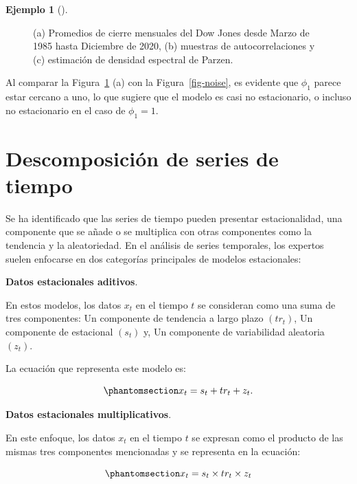 \documentclass[
  us-letterpaper,
]{scrreprt}
\theoremstyle{plain}
\theoremstyle{definition}
\theoremstyle{definition}
\newtheorem{example}{Ejemplo}[chapter]
\theoremstyle{remark}
\begin{document}
\begin{example}[]
\begin{tcolorbox}
\begin{figure}[H]
{}

\caption{\label{fig-DOW}(a) Promedios de cierre mensuales del Dow Jones
desde Marzo de 1985 hasta Diciembre de 2020, (b) muestras de
autocorrelaciones y (c) estimación de densidad espectral de Parzen.}

\end{figure}%

Al comparar la Figura~\ref{fig-DOW} (a) con la Figura~\ref{fig-noise},
es evidente que \(\phi_1\) parece estar cercano a uno, lo que sugiere
que el modelo es casi no estacionario, o incluso no estacionario en el
caso de \(\phi_1 = 1\).

\end{tcolorbox}

\end{example}

\section{Descomposición de series de
tiempo}\label{descomposiciuxf3n-de-series-de-tiempo}

Se ha identificado que las series de tiempo pueden presentar
estacionalidad, una componente que se añade o se multiplica con otras
componentes como la tendencia y la aleatoriedad. En el análisis de
series temporales, los expertos suelen enfocarse en dos categorías
principales de modelos estacionales:

\textbf{Datos estacionales aditivos}.

En estos modelos, los datos \(x_t\) en el tiempo \(t\) se consideran
como una suma de tres componentes: Un componente de tendencia a largo
plazo \((tr_t)\), Un componente de estacional \((s_t)\) y, Un componente
de variabilidad aleatoria \((z_t)\).

La ecuación que representa este modelo es:

\begin{equation}\phantomsection\label{eq-daditive}{
x_t = s_t + tr_t + z_t.
}\end{equation}

\textbf{Datos estacionales multiplicativos}.

En este enfoque, los datos \(x_t\) en el tiempo \(t\) se expresan como
el producto de las mismas tres componentes mencionadas y se representa
en la ecuación:

\begin{equation}\phantomsection\label{eq-dmultiplicative}{
x_t = s_t \times tr_t \times z_t
}\end{equation}
\end{document}

